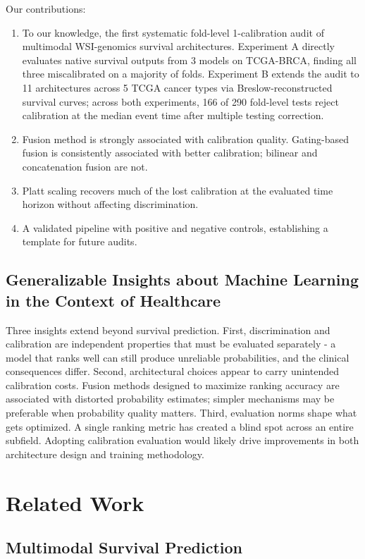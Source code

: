 \documentclass[pmlr]{jmlr}
\begin{document}
Our contributions:
\begin{enumerate}
    \item To our knowledge, the first systematic fold-level 1-calibration audit of multimodal WSI-genomics survival architectures. Experiment A directly evaluates native survival outputs from 3 models on TCGA-BRCA, finding all three miscalibrated on a majority of folds. Experiment B extends the audit to 11 architectures across 5 TCGA cancer types via Breslow-reconstructed survival curves; across both experiments, 166 of 290 fold-level tests reject calibration at the median event time after multiple testing correction.
    \item Fusion method is strongly associated with calibration quality. Gating-based fusion is consistently associated with better calibration; bilinear and concatenation fusion are not.
    \item Platt scaling recovers much of the lost calibration at the evaluated time horizon without affecting discrimination.
    \item A validated pipeline with positive and negative controls, establishing a template for future audits.
\end{enumerate}

\subsection*{Generalizable Insights about Machine Learning in the Context of Healthcare}

Three insights extend beyond survival prediction. First, discrimination and calibration are independent properties that must be evaluated separately - a model that ranks well can still produce unreliable probabilities, and the clinical consequences differ. Second, architectural choices appear to carry unintended calibration costs. Fusion methods designed to maximize ranking accuracy are associated with distorted probability estimates; simpler mechanisms may be preferable when probability quality matters. Third, evaluation norms shape what gets optimized. A single ranking metric has created a blind spot across an entire subfield. Adopting calibration evaluation would likely drive improvements in both architecture design and training methodology.

\section{Related Work}

\subsection{Multimodal Survival Prediction}
\end{document}

